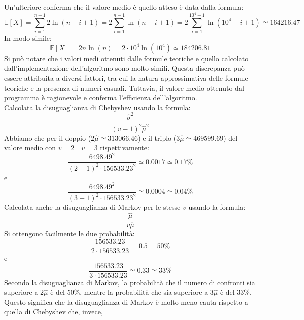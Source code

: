 \documentclass[12pt]{article}
\begin{document}
Un'ulteriore conferma che il valore medio è quello atteso è data dalla formula:
\begin{equation*}
    \mathbb{E}[X] = \sum_{i=1}^{n-1}2\ln(n-i+1) = 2\sum_{i=1}^{n-1}\ln(n-i+1)
    = 2\sum_{i=1}^{10^{4}-1}\ln(10^{4}-i+1) \simeq 164216.47
\end{equation*}
In modo simile:
\begin{equation*}
    \mathbb{E}[X]=2n\ln(n) = 2\cdot 10^{4}\ln(10^{4}) \simeq 184206.81
\end{equation*}
Si può notare che i valori medi ottenuti dalle formule teoriche e quello
calcolato dall'implementazione dell'algoritmo sono molto simili.
Questa discrepanza può essere attribuita a diversi fattori, tra cui la natura
approssimativa delle formule teoriche e la presenza di numeri casuali. Tuttavia,
il valore medio ottenuto dal programma è ragionevole e conferma l'efficienza
dell'algoritmo.\\
Calcolata la disuguaglianza di Chebyshev usando la formula:
\begin{equation*}
    \frac{\hat{\sigma}^{2}}{(v-1)^{2}\hat{\mu}^{2}}
\end{equation*}
Abbiamo che  per il 
doppio ($2\hat{\mu}\simeq 313066.46$) e il triplo 
($3\hat{\mu} \simeq 469599.69$) del valore medio con 
$v=2 \quad v=3$ rispettivamente:
\begin{equation*}
    \frac{6498.49^{2}}{(2-1)^{2}\cdot 156533.23^{2}} \simeq 0.0017 
    \simeq 0.17\%
\end{equation*}
e
\begin{equation*}
    \frac{6498.49^{2}}{(3-1)^{2}\cdot 156533.23^{2}} \simeq 0.0004 
    \simeq 0.04\%
\end{equation*}
Calcolata anche la disuguaglianza di Markov per le stesse $v$ usando la formula:
\begin{equation*}
    \frac{\hat{\mu}}{v\hat{\mu}}
\end{equation*}
Si ottengono facilmente le due probabilità:
\begin{equation*}
    \frac{156533.23}{2\cdot 156533.23} = 0.5 = 50\%
\end{equation*}
e
\begin{equation*}
    \frac{156533.23}{3\cdot 156533.23} \simeq 0.33 \simeq 33\%
\end{equation*}
Secondo la disuguaglianza di Markov, la probabilità che il numero di confronti
sia superiore a $2\hat{\mu}$ è del 50\%, mentre la probabilità che sia
superiore a $3\hat{\mu}$ è del 33\%. Questo significa che la disuguaglianza
di Markov è molto meno cauta rispetto a quella di Chebyshev che, invece, 
\end{document}
